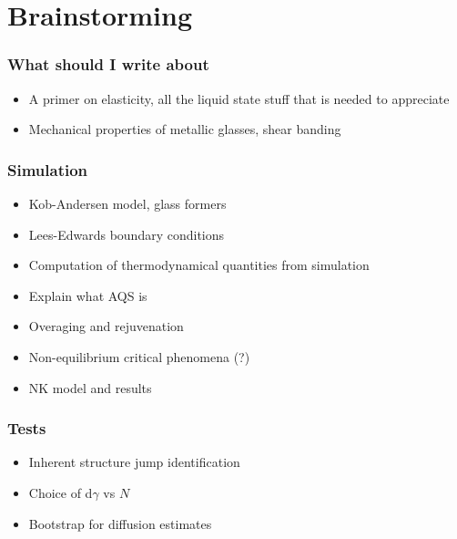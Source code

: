 \chapter*{Brainstorming}

\subsection*{What should I write about}

\begin{itemize}
	
	\item A primer on elasticity, all the liquid state stuff that is needed to appreciate
	\item Mechanical properties of metallic glasses, shear banding
	
\end{itemize}

\subsection*{Simulation}

\begin{itemize}
	
	\item Kob-Andersen model, glass formers
	\item Lees-Edwards boundary conditions
	\item Computation of thermodynamical quantities from simulation
	\item Explain what AQS is
	\item Overaging and rejuvenation
	\item Non-equilibrium critical phenomena (?)
	\item NK model and results
	
\end{itemize}

\subsection*{Tests}

\begin{itemize}
	\item Inherent structure jump identification
	\item Choice of d$\gamma$ vs $N$
	\item Bootstrap for diffusion estimates
\end{itemize}


